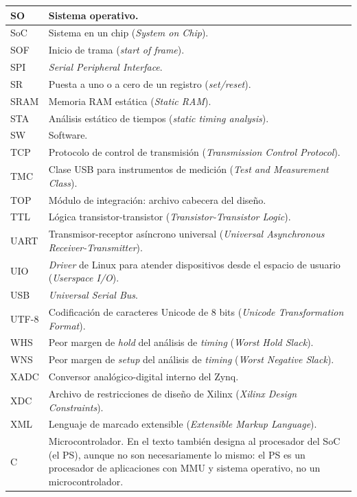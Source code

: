 {\begin{longtable}{|>{\raggedright\arraybackslash}p{}%
  |>{\raggedright\arraybackslash}p{}|}
SO & Sistema operativo. \\ \hline
SoC & Sistema en un chip (\emph{System on Chip}). \\ \hline
SOF & Inicio de trama (\emph{start of frame}). \\ \hline
SPI & \emph{Serial Peripheral Interface}. \\ \hline
SR & Puesta a uno o a cero de un registro (\emph{set/reset}). \\ \hline
SRAM & Memoria RAM estática (\emph{Static RAM}). \\ \hline
STA & Análisis estático de tiempos (\emph{static timing analysis}). \\ \hline
SW & Software. \\ \hline
TCP & Protocolo de control de transmisión (\emph{Transmission Control Protocol}). \\ \hline
TMC & Clase USB para instrumentos de medición (\emph{Test and Measurement Class}). \\ \hline
TOP & Módulo de integración: archivo cabecera del diseño. \\ \hline
TTL & Lógica transistor-transistor (\emph{Transistor-Transistor Logic}). \\ \hline
UART & Transmisor-receptor asíncrono universal (\emph{Universal Asynchronous Receiver-Transmitter}). \\ \hline
UIO & \emph{Driver} de Linux para atender dispositivos desde el espacio de usuario (\emph{Userspace I/O}). \\ \hline
USB & \emph{Universal Serial Bus}. \\ \hline
UTF-8 & Codificación de caracteres Unicode de 8 bits (\emph{Unicode Transformation Format}). \\ \hline
WHS & Peor margen de \emph{hold} del análisis de \emph{timing} (\emph{Worst Hold Slack}). \\ \hline
WNS & Peor margen de \emph{setup} del análisis de \emph{timing} (\emph{Worst Negative Slack}). \\ \hline
XADC & Conversor analógico-digital interno del Zynq. \\ \hline
XDC & Archivo de restricciones de diseño de Xilinx (\emph{Xilinx Design Constraints}). \\ \hline
XML & Lenguaje de marcado extensible (\emph{Extensible Markup Language}). \\ \hline
\textmu{}C & Microcontrolador. En el texto también designa al procesador del SoC (el PS), aunque no son necesariamente lo mismo: el PS es un procesador de aplicaciones con MMU y sistema operativo, no un microcontrolador. \\ \hline
\end{longtable}
}
